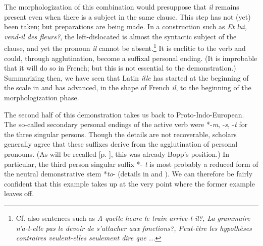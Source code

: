 The morphologization of this combination would presuppose that \textit{il} remains present even when there is a subject in the same clause. This step has not (yet) been taken; but preparations are being made. In a construction such as \textit{Et lui, vend-il des fleurs?}, the left-dislocated \np is almost the syntactic subject of the clause, and yet the pronoun \textit{il} cannot be absent.\footnote{Cf. also sentences such as \textit{A quelle heure le train arrive-t-il?, La grammaire n'a-t-elle pas le devoir de s'attacher aux fonctions?, Peut-être les hypothèses contraires veulent-elles seulement dire que ...}} It is enclitic to the verb and could, through agglutination, become a suffixal personal ending. (It is improbable that it will do so in French; but this is not essential to the demonstration.) Summarizing then, we have seen that Latin \textit{ille} has started at the beginning of the scale in  and has advanced, in the shape of French \textit{il}, to the beginning of the morphologization phase.

The second half of this demonstration takes us back to Proto-Indo-European. The so-called secondary personal endings of the active verb were *-\textit{m}, -\textit{s}, -\textit{t} for the three singular persons. Though the details are not recoverable, scholars generally agree that these suffixes derive from the agglutination of personal pronouns. (As will be recalled [p. \pageref{Bopp}], this was already Bopp's position.) In particular, the third person singular suffix *- \textit{t} is most probably a reduced form of the neutral demonstrative stem *\textit{to}{}- (details in \citet[302--305]{Szemerényi1970} and \citealt{Seebold1971}). We can therefore be fairly confident that this example takes up at the very point where the former example leaves off.

